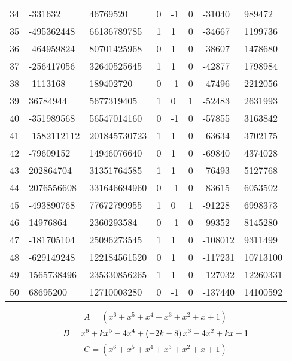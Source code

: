 \documentclass{amsart}
\begin{document}
\begin{longtable}{|l|l|l|lllll|}
34&-331632&46769520&0&-1&0&-31040&989472\\
35&-495362448&66136789785&1&1&0&-34667&1199736\\
36&-464959824&80701425968&0&1&0&-38607&1478680\\
37&-256417056&32640525645&1&1&0&-42877&1798984\\
38&-1113168&189402720&0&-1&0&-47496&2212056\\
39&36784944&5677319405&1&0&1&-52483&2631993\\
40&-351989568&56547014160&0&-1&0&-57855&3163842\\
41&-1582112112&201845730723&1&1&0&-63634&3702175\\
42&-79609152&14946076640&0&1&0&-69840&4374028\\
43&202864704&31351764585&1&1&0&-76493&5127768\\
44&2076556608&331646694960&0&-1&0&-83615&6053502\\
45&-493890768&77672799955&1&0&1&-91228&6998373\\
46&14976864&2360293584&0&-1&0&-99352&8145280\\
47&-181705104&25096273545&1&1&0&-108012&9311499\\
48&-629149248&122184561520&0&1&0&-117231&10713100\\
49&1565738496&235330856265&1&1&0&-127032&12260331\\
50&68695200&12710003280&0&-1&0&-137440&14100592\\
\hline
\end{longtable}
$$A=(x^6
 + x^5
 + x^4
 + x^3
 + x^2
 + x
 + 1)$$
$$B=x^6
 + k\*x^5
 - 4\*x^4
 + \left(-2\*k
 - 8\right) \*x^3
 - 4\*x^2
 + k\*x
 + 1$$
$$C=(x^6
 + x^5
 + x^4
 + x^3
 + x^2
 + x
 + 1)$$
\end{document}
